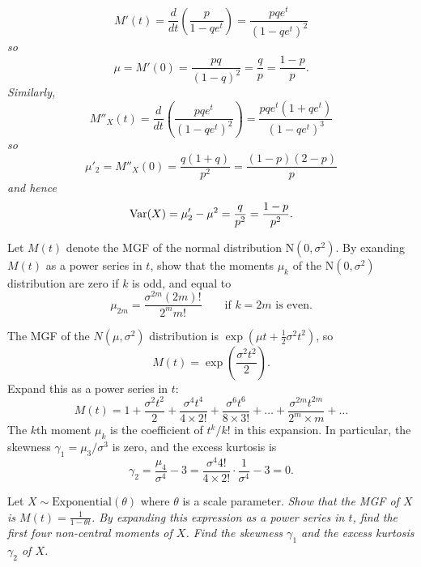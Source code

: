 \begin{exercise}
\begin{questions}
\begin{answer}
\it %
\[
M'(t) = \frac{d}{dt}\left(\frac{p}{1-qe^t}\right) = \frac{pqe^t}{(1-qe^t)^2}
\]
so
\[
\mu = M'(0) = \frac{pq}{(1-q)^2} = \frac{q}{p} = \frac{1-p}{p}.
\]
Similarly,
\[
M''_{X}(t) 
	= \frac{d}{dt}\left(\frac{pqe^t}{(1-qe^t)^2}\right) 
	= \frac{pqe^t(1+qe^t)}{(1-qe^t)^3}
\]
so
\[
\mu'_2 = M''_{X}(0) = \frac{q(1+q)}{p^2} = \frac{(1-p)(2-p)}{p}
\]
and hence
\[
\text{Var}(X) = \mu'_2 - \mu^2 = \frac{q}{p^2} = \frac{1-p}{p^2}.
\]
\een
\end{answer}



\question
Let $M(t)$ denote the MGF of the normal distribution $\text{N}(0,\sigma^2)$. By exanding $M(t)$ as a power series in $t$, show that the moments $\mu_k$ of the $\text{N}(0,\sigma^2)$ distribution are zero if $k$ is odd, and equal to 
\[
\mu_{2m} = \frac{\sigma^{2m}(2m)!}{2^m m!} \qquad\text{if $k=2m$ is even.}
\]

\begin{answer}
The MGF of the $N(\mu,\sigma^2)$ distribution is $\exp\left(\mu t + \frac{1}{2}\sigma^2 t^2 \right)$, so 
\[
M(t) = \exp\left(\frac{\sigma^2 t^2}{2}\right).
\]
Expand this as a power series in $t$:
\[
M(t) = 1 + \frac{\sigma^2 t^2}{2} + \frac{\sigma^4 t^4}{4\times 2!} + \frac{\sigma^6 t^6}{8\times 3!} 
			+ \ldots + \frac{\sigma^{2m}t^{2m}}{2^m\times m} + \ldots
\]
The $k$th moment $\mu_k$ is the coefficient of $t^{k}/k!$ in this expansion. In particular, the skewness $\gamma_1=\mu_3/\sigma^3$ is zero, and the excess kurtosis is
\[
\gamma_2 = \frac{\mu_4}{\sigma^4} -3 = \frac{\sigma^4 4!}{4\times 2!}\cdot\frac{1}{\sigma^4} - 3 = 0.
\]
\end{answer}



\question
Let $X\sim\text{Exponential}(\theta)$ where $\theta$ is a scale parameter.
%
\ben
\it Show that the MGF of $X$ is $M(t) = \displaystyle\frac{1}{1-\theta t}$.
\it By expanding this expression as a power series in $t$, find the first four non-central moments of $X$.
\it Find the skewness $\gamma_1$ and the excess kurtosis $\gamma_2$ of $X$.
\een


\end{questions}
\end{exercise}
